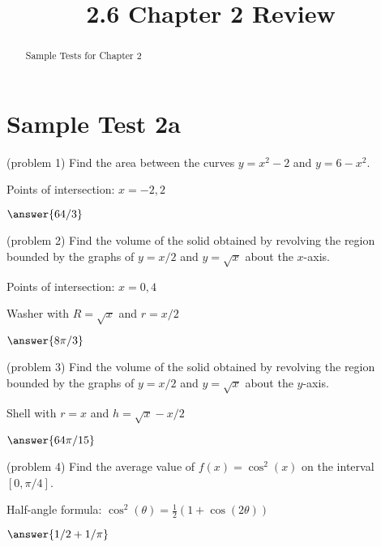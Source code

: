 \documentclass[handout]{ximera}
\title{2.6 Chapter 2 Review}
\begin{document}
\begin{abstract}
Sample Tests for Chapter 2
\end{abstract}

\maketitle

\section{Sample Test 2a}

\begin{problem}(problem 1)
Find the area between the curves $y = x^2 - 2$ and $y = 6 -x^2$.\\
\begin{hint}
Points of intersection: $x = -2, 2$
\end{hint}
$\answer{64/3}$
\end{problem}


\begin{problem}(problem 2)
Find the volume of the solid obtained by revolving the region bounded by the 
graphs of $y = x/2$ and $y = \sqrt x$ about the $x$-axis.\\
\begin{hint}
Points of intersection: $x = 0, 4$
\end{hint}\begin{hint}
Washer with $R = \sqrt x$ and $r = x/2$
\end{hint}
$\answer{8\pi/3}$
\end{problem}


\begin{problem}(problem 3)
Find the volume of the solid obtained by revolving the region bounded by the 
graphs of $y = x/2$ and $y = \sqrt x$ about the $y$-axis.\\
\begin{hint}
Shell with $r = x$ and $h = \sqrt x - x/2$
\end{hint}
$\answer{64\pi/15}$
\end{problem}


\begin{problem}(problem 4)
Find the average value of $f(x) = \cos^2(x)$ on the interval $[0, \pi/4]$.\\
\begin{hint}
Half-angle formula: $\cos^2(\theta) = \frac12 (1+\cos(2\theta))$
\end{hint}
$\answer{1/2 + 1/\pi}$
\end{problem}
\end{document}
